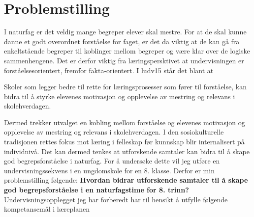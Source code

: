 \documentclass[main.tex]{subfiles}
\begin{document}
\section*{Problemstilling}

I naturfag er det veldig mange begreper elever skal mestre. For at de skal kunne danne et godt 
overordnet forståelse for faget, er det da viktig at de kan gå fra enkeltstående begreper til 
koblinger mellom begreper og være klar over de logiske sammenhengene. Det er derfor viktig fra 
læringspersktivet at undervisningen er forståelsesorientert, fremfor fakta-orientert. I \citeA
{ludv15} står det blant at
\begin{displayquote}
Skoler som legger bedre til rette for læringsprosesser som fører til forståelse, kan bidra til å 
styrke elevenes motivasjon og opplevelse av mestring og relevans i skolehverdagen. 
\end{displayquote}
Dermed trekker utvalget en kobling mellom forståelse og elevenes motivasjon og opplevelse av
mestring og relevans i skolehverdagen. I den sosiokulturelle tradisjonen rettes fokus mot læring i 
felleskap før kunnskap blir internalisert på individnivå. Det kan dermed tenkes at utforskende 
samtaler kan bidra til å skape god begrepsforståelse i naturfag. For å undersøke dette vil jeg
utføre en undervisningssekvens i en ungdomskole for en 8. klasse.
\newline
\newline
Derfor er min problemstilling følgende:
\newline
\newline
\textbf{Hvordan bidrar utforskende samtaler til å skape god begrepsforståelse i en naturfagstime 
for 8. trinn?}
\newline
\newline
Undervisningsopplegget jeg har forberedt har til hensikt å utfylle følgende kompetansemål i 
læreplanen
\end{document}
